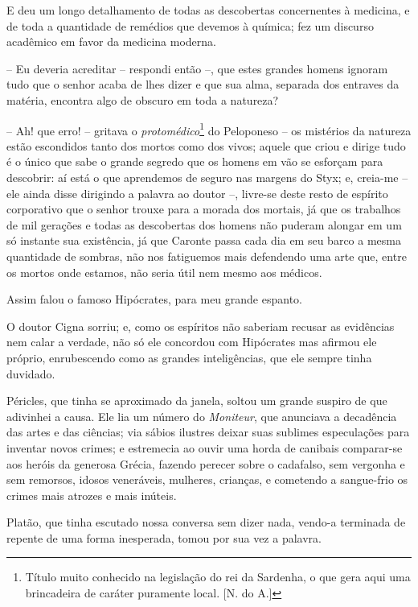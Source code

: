 E deu um longo detalhamento de todas as descobertas concernentes à
medicina, e de toda a quantidade de remédios que devemos à química; fez
um discurso acadêmico em favor da medicina moderna.

 -- Eu deveria acreditar -- respondi então --, que estes grandes
homens ignoram tudo que o senhor acaba de lhes dizer e que sua alma,
separada dos entraves da matéria, encontra algo de obscuro em toda a
natureza?

 -- Ah! que erro! -- gritava o \textit{protomédico}\footnote{ Título
muito conhecido na legislação do rei da Sardenha, o que gera aqui uma
brincadeira de caráter puramente local. [N. do A.]} do Peloponeso -- os
mistérios da natureza estão escondidos tanto dos mortos como dos vivos;
aquele que criou e dirige tudo é o único que sabe o grande segredo que
os homens em vão se esforçam para descobrir: aí está o que aprendemos
de seguro nas margens do Styx; e, creia-me -- ele ainda disse
dirigindo a palavra ao doutor --, livre-se deste resto de espírito
corporativo que o senhor trouxe para a morada dos mortais, já que os
trabalhos de mil gerações e todas as descobertas dos homens não puderam
alongar em um só instante sua existência, já que Caronte passa cada dia
em seu barco a mesma quantidade de sombras, não nos fatiguemos mais
defendendo uma arte que, entre os mortos onde estamos, não seria útil
nem mesmo aos médicos.

 Assim falou o famoso Hipócrates, para meu grande espanto.

 O doutor Cigna sorriu; e, como os espíritos não saberiam recusar as
evidências nem calar a verdade, não só ele concordou com Hipócrates mas
afirmou ele próprio, enrubescendo como as grandes inteligências, que
ele sempre tinha duvidado. 

 Péricles, que tinha se aproximado da janela, soltou um grande suspiro
de que adivinhei a causa. Ele lia um número do \textit{Moniteur}, que       %
anunciava a decadência das artes e das ciências; via sábios ilustres
deixar suas sublimes especulações para inventar novos crimes; e
estremecia ao ouvir uma horda de canibais comparar-se aos heróis da
generosa Grécia, fazendo perecer sobre o cadafalso, sem vergonha e sem
remorsos, idosos veneráveis, mulheres, crianças, e cometendo a
sangue-frio os crimes mais atrozes e mais inúteis.

 Platão, que tinha escutado nossa conversa sem dizer nada, vendo-a
terminada de repente de uma forma inesperada, tomou por sua vez a
palavra.

